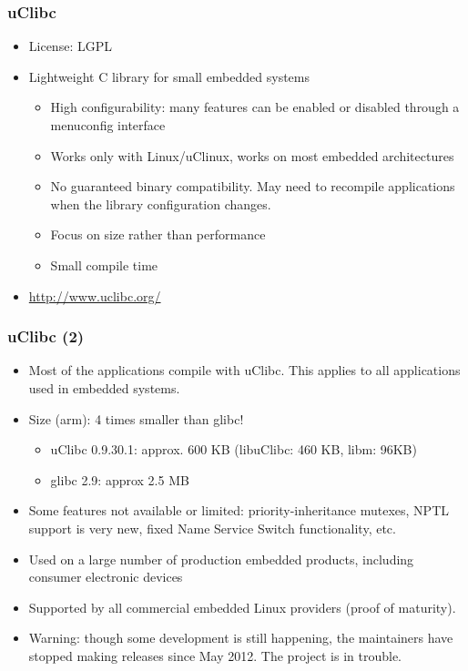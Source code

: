 \begin{frame}
  \frametitle{uClibc}
  \begin{itemize}
  \item License: LGPL
  \item Lightweight C library for small embedded systems
    \begin{itemize}
    \item High configurability: many features can be enabled or
      disabled through a menuconfig interface
    \item Works only with Linux/uClinux, works on most embedded
      architectures
    \item No guaranteed binary compatibility. May need to
      recompile applications when the library configuration changes.
    \item Focus on size rather than performance
    \item Small compile time
    \end{itemize}
  \item \url{http://www.uclibc.org/}
  \end{itemize}
\end{frame}

\begin{frame}
  \frametitle{uClibc (2)}
  \begin{itemize}
  \item Most of the applications compile with uClibc. This applies to
    all applications used in embedded systems.
  \item Size (arm): 4 times smaller than glibc!
    \begin{itemize}
    \item uClibc 0.9.30.1: approx. 600 KB (libuClibc: 460 KB, libm:
      96KB)
    \item glibc 2.9: approx 2.5 MB
    \end{itemize}
  \item Some features not available or limited: priority-inheritance
    mutexes, NPTL support is very new, fixed Name Service Switch
    functionality, etc.
  \item Used on a large number of production embedded products,
    including consumer electronic devices
  \item Supported by all commercial embedded Linux providers (proof of
        maturity).
  \item Warning: though some development is still happening,
        the maintainers have stopped making releases since May 2012.
        The project is in trouble.
\end{itemize}
\end{frame}

